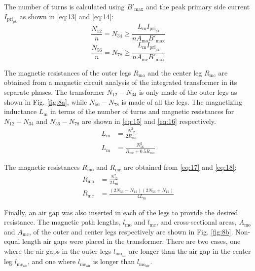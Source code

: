 \documentclass[lettersize,journal]{IEEEtran}
\begin{document}
The number of turns is calculated using $B'_{\mathrm{max}}$ and the peak primary side current $I_{\mathrm{pri}_{\mathrm{pk}}}$ as shown in \eqref{eq:13} and \eqref{eq:14}:
\begin{equation}
\label{eq:13}
\frac{N_{12}}{n} = N_{34} \ge \frac{L_{\mathrm{m}} I_{\mathrm{pri}_{\mathrm{pk}}}}{n A_{\mathrm{mo}} B'_{\mathrm{max}}}
\end{equation}
\begin{equation}
\label{eq:14}
\frac{N_{56}}{n} = N_{78} \ge \frac{L_{\mathrm{m}} I_{\mathrm{pri}_{\mathrm{pk}}}}{n A_{\mathrm{mc}} B'_{\mathrm{max}}}
\end{equation}

The magnetic resistances of the outer legs $R_{\mathrm{mo}}$ and the center leg $R_{\mathrm{mc}}$ are obtained from a magnetic circuit analysis of the integrated transformer in its separate phases. The transformer $N_{12}-N_{34}$ is only made of the outer legs as shown in Fig. \ref{fig:8a}, while $N_{56}-N_{78}$ is made of all the legs. The magnetizing inductance $L_{\mathrm{m}}$ in terms of the number of turns and magnetic resistances for $N_{12}-N_{34}$ and $N_{56}-N_{78}$ are shown in \eqref{eq:15} and \eqref{eq:16} respectively.
\begin{align}
L_{\mathrm{m}} &= \frac{N_{12}^2}{2 R_{\mathrm{mo}}} \label{eq:15}\\
L_{\mathrm{m}} &= \frac{N_{56}^2}{R_{\mathrm{mc}} + 0.5 R_{\mathrm{mo}}} \label{eq:16}
\end{align}

The magnetic resistances $R_{\mathrm{mo}}$ and $R_{\mathrm{mc}}$ are obtained from \eqref{eq:17} and \eqref{eq:18}:
\begin{align}
R_{\mathrm{mo}} &= \frac{N_{12}^2}{2 L_{\mathrm{m}}} \label{eq:17}\\
R_{\mathrm{mc}} &= \frac{(2 N_{56} - N_{12})(2 N_{56} + N_{12})}{4 L_{\mathrm{m}}} \label{eq:18}
\end{align}

Finally, an air gap was also inserted in each of the legs to provide the desired resistance. The magnetic path lengths, $l_{\mathrm{mo}}$ and $l_{\mathrm{mc}}$, and cross-sectional areas, $A_{\mathrm{mo}}$ and $A_{\mathrm{mc}}$, of the outer and center legs respectively are shown in Fig. \ref{fig:8b}. Non-equal length air gaps were placed in the transformer. There are two cases, one where the air gaps in the outer legs $l_{\mathrm{mo}_{\mathrm{air}}}$ are longer than the air gap in the center leg $l_{\mathrm{mc}_{\mathrm{air}}}$, and one where $l_{\mathrm{mc}_{\mathrm{air}}}$ is longer than $l_{\mathrm{mo}_{\mathrm{air}}}$.
\end{document}
